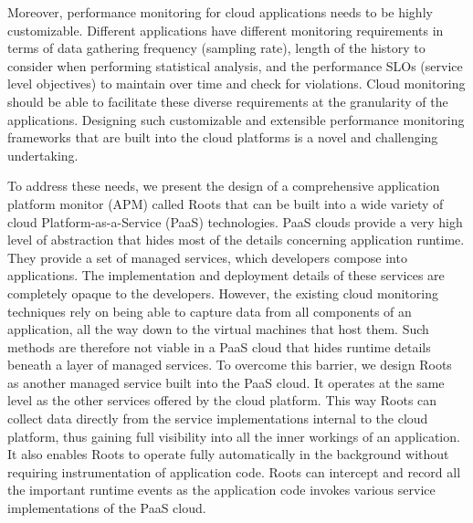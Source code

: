 Moreover, performance monitoring for cloud applications needs to be highly customizable. Different
applications have different monitoring requirements in terms of data gathering frequency (sampling rate), 
length of the history to consider when performing statistical analysis, and the performance 
SLOs (service level objectives) to maintain over time and check for violations. Cloud monitoring
should be able to facilitate these diverse requirements at the granularity of the applications.
Designing such customizable and extensible performance
monitoring frameworks that are built into the cloud platforms is a novel and challenging undertaking.

To address these needs, we present the design of  a comprehensive application platform 
monitor (APM) called Roots that can be built into a wide variety of cloud Platform-as-a-Service (PaaS) technologies. 
PaaS clouds provide a very high level of abstraction that hides most of the details concerning application
runtime. They provide a set of managed services, which developers compose into applications.
The implementation and deployment details of these services are completely opaque to the developers. 
However, the existing cloud monitoring techniques rely on being able to capture data from all components 
of an application, all the way down to the virtual machines that host them. Such methods are
therefore not viable in a PaaS cloud that hides runtime details beneath a layer of managed services.
To overcome this barrier, we design Roots as another managed service built into the PaaS cloud.
It operates at the same level as the other services offered by the cloud platform. This way Roots can collect data
directly from the service implementations internal to the cloud platform, thus gaining full visibility into all the 
inner workings of an application. It also enables Roots to operate fully automatically in the background without
requiring instrumentation of application code. Roots can intercept and record all the important runtime events as the
application code invokes various service implementations of the PaaS cloud.


